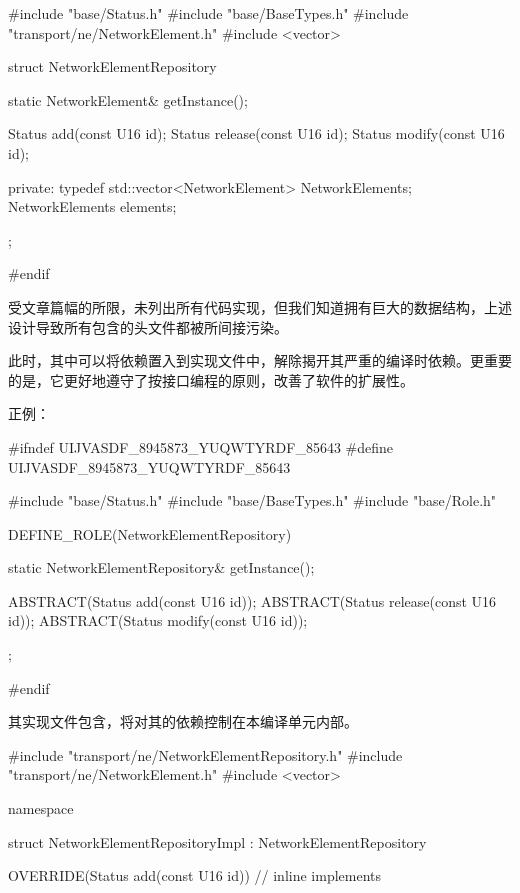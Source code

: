 \begin{content}
\begin{leftbar}
\begin{c++}[caption={ne/NetworkElementRepository.h}]
#include "base/Status.h"
#include "base/BaseTypes.h"
#include "transport/ne/NetworkElement.h"
#include <vector>

struct NetworkElementRepository
{
    static NetworkElement& getInstance();

    Status add(const U16 id);
    Status release(const U16 id);
    Status modify(const U16 id);
    
private:
    typedef std::vector<NetworkElement> NetworkElements;
    NetworkElements elements;
};

#endif
\end{c++}
\end{leftbar}

受文章篇幅的所限，未列出所有代码实现，但我们知道拥有巨大的数据结构，上述设计导致所有包含的头文件都被所间接污染。

此时，其中可以将依赖置入到实现文件中，解除揭开其严重的编译时依赖。更重要的是，它更好地遵守了按接口编程的原则，改善了软件的扩展性。

正例：
\begin{leftbar}
\begin{c++}[caption={ne/NetworkElementRepository.h}]
#ifndef UIJVASDF_8945873_YUQWTYRDF_85643
#define UIJVASDF_8945873_YUQWTYRDF_85643    

#include "base/Status.h"
#include "base/BaseTypes.h"
#include "base/Role.h"

DEFINE_ROLE(NetworkElementRepository)
{
    static NetworkElementRepository& getInstance();

    ABSTRACT(Status add(const U16 id));
    ABSTRACT(Status release(const U16 id));
    ABSTRACT(Status modify(const U16 id));
};

#endif
\end{c++}
\end{leftbar}

其实现文件包含，将对其的依赖控制在本编译单元内部。

\begin{leftbar}
\begin{c++}[caption={ne/NetworkElementRepository.cpp}]

#include "transport/ne/NetworkElementRepository.h"
#include "transport/ne/NetworkElement.h"
#include <vector>

namespace
{
    struct NetworkElementRepositoryImpl : NetworkElementRepository
    {
        OVERRIDE(Status add(const U16 id))
        {
            // inline implements
        }

}}
\end{c++}
\end{leftbar}
\end{content}
